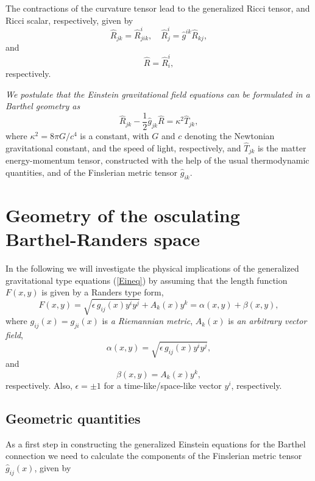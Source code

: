 \documentclass[aps,superscriptaddress, showpacs,preprintnumbers, superscriptaddress, nofootinbibt,twocolumn]{revtex4-2}
\def\be{\begin{equation}}
\def\ee{\end{equation}}
\begin{document}
The contractions of the curvature tensor lead to the generalized Ricci
tensor, and Ricci scalar, respectively, given by
\begin{equation}
\hat{R}_{jk}=\hat{R}_{jik}^{i},\quad\hat{R}_{j}^{i}=\hat{g}^{ik}\hat{R}_{kj},
\end{equation}%
and
\begin{equation}
\hat{R}=\hat{R}_{i}^{i},
\end{equation}%
respectively.

\textit{We postulate that the Einstein gravitational field equations can be
formulated in a Barthel geometry as}
\begin{equation}
\hat{R}_{jk}-\frac{1}{2}\hat{g}_{jk}\hat{R}=\kappa ^2 \hat{T}_{jk},  \label{Eineq}
\end{equation}%
where $\kappa^2=8\pi G/c^4 $ is a constant, with $G$ and $c$ denoting the Newtonian gravitational constant, and the speed of light, respectively, and $\hat{T}_{jk}$ is the matter
energy-momentum tensor, constructed with the help of the usual thermodynamic
quantities, and of the Finslerian metric tensor $\hat{g}_{ik}$.

\section{Geometry of the osculating Barthel-Randers space}\label{sect2}

In the following we will investigate the physical implications of the
generalized gravitational type equations (\ref{Eineq}) by assuming that the
length function $F\left( x,y\right) $ is given by a Randers \cite{Rand} type
form,
\begin{equation}
F\left( x,y\right) =\sqrt{\epsilon \,g_{ij}(x)y^{i}y^{j}}+A_{k}(x)y^{k}=%
\alpha \left( x,y\right) +\beta (x,y),
\end{equation}%
where $g_{ij}(x)=g_{ji}(x)$ is {\it a Riemannian metric}, $A_{k}(x)$ is {\it an
arbitrary vector field},
\be
\alpha \left( x,y\right) =\sqrt{\epsilon%
\,g_{ij}(x)y^{i}y^{j}},
\ee
and
\be
\beta (x,y)=A_{k}(x)y^{k},
\ee
respectively.
Also, $\epsilon=\pm1$ for a time-like/space-like vector $y^i$, respectively.

\subsection{Geometric quantities}

As a first step in constructing the generalized Einstein equations for the
Barthel connection we need to calculate the components of the Finslerian
metric tensor $\hat{g}_{ij}(x)$, given by \cite{Mats, Pey}
\end{document}
